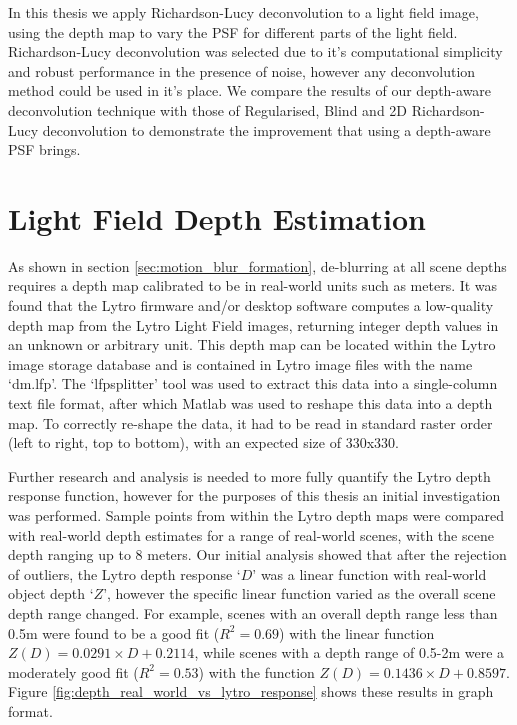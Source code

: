 In this thesis we apply Richardson-Lucy deconvolution to a light field image, using the depth map to vary the PSF for different parts of the light field.
Richardson-Lucy deconvolution was selected due to it's computational simplicity and robust performance in the presence of noise, however any deconvolution method could be used in it's place.
We compare the results of our depth-aware deconvolution technique with those of Regularised, Blind and 2D Richardson-Lucy deconvolution to demonstrate the improvement that using a depth-aware PSF brings.

\section{Light Field Depth Estimation}
\label{sec:light_field_depth_estimation}

As shown in section \ref{sec:motion_blur_formation}, de-blurring at all scene depths requires a depth map calibrated to be in real-world units such as meters.
It was found that the Lytro firmware and/or desktop software computes a low-quality depth map from the Lytro Light Field images, returning integer depth values in an unknown or arbitrary unit.
This depth map can be located within the Lytro image storage database and is contained in Lytro image files with the name \enquote*{dm.lfp}.
The \enquote*{lfpsplitter} tool \cite{patel2013lfptools} was used to extract this data into a single-column text file format, after which Matlab was used to reshape this data into a depth map.
To correctly re-shape the data, it had to be read in standard raster order (left to right, top to bottom), with an expected size of 330x330.

Further research and analysis is needed to more fully quantify the Lytro depth response function, however for the purposes of this thesis an initial investigation was performed.
Sample points from within the Lytro depth maps were compared with real-world depth estimates for a range of real-world scenes, with the scene depth ranging up to 8 meters.
Our initial analysis showed that after the rejection of outliers, the Lytro depth response \enquote*{$D$} was a linear function with real-world object depth \enquote*{$Z$}, however the specific linear function varied as the overall scene depth range changed.
For example, scenes with an overall depth range less than 0.5m were found to be a good fit ($R^2 = 0.69$) with the linear function $Z(D) = 0.0291 \times D + 0.2114$, while scenes with a depth range of 0.5-2m were a moderately good fit ($R^2 = 0.53$) with the function $Z(D) = 0.1436 \times D + 0.8597$.
Figure \ref{fig:depth_real_world_vs_lytro_response} shows these results in graph format.

